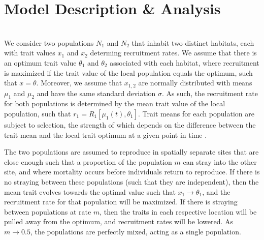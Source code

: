 \documentclass[twocolumn,preprintnumbers,amsmath,amssymb,superscriptaddress]{revtex4}
\begin{document}
\section{Model Description \& Analysis}

\\
\noindent We consider two populations $N_1$ and $N_2$ that inhabit two distinct habitats, each with trait values $x_1$ and $x_2$ determing recruitment rates.
We assume that there is an optimum trait value $\theta_1$ and $\theta_2$ associated with each habitat, where recruitment is maximized if the trait value of the local population equals the optimum, such that $x = \theta$.
Moreover, we assume that $x_{1,2}$ are normally distributed with means $\mu_1$ and $\mu_2$ and have the same standard deviation $\sigma$.
As such, the recruitment rate for both populations is determined by the mean trait value of the local population, such that $r_1 = R_1[\mu_1(t),\theta_1]$.
Trait means for each population are subject to selection, the strength of which depends on the difference between the trait mean and the local trait optimum at a given point in time \cite{simpson1953major,Lande:1976ga}.

The two populations are assumed to reproduce in spatially separate sites that are close enough such that a proportion of the population $m$ can stray into the other site, and where mortality occurs before individuals return to reproduce.
If there is no straying between these populations (such that they are independent), then the mean trait evolves towards the optimal value such that $x_1 \rightarrow \theta_1$, and the recruitment rate for that population will be maximized.
If there is straying between populations at rate $m$, then the traits in each respective location will be pulled away from the optimum, and recruitment rates will be lowered.
As $m \rightarrow 0.5$, the populations are perfectly mixed, acting as a single population.
\end{document}
